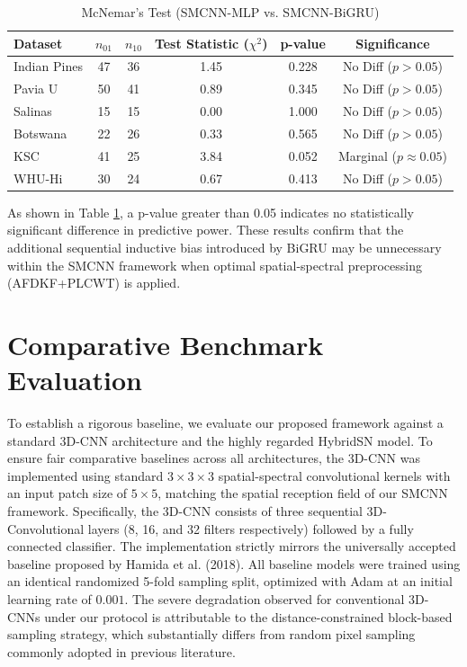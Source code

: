 \documentclass[pdflatex,sn-mathphys-num,iicol]{sn-jnl}
\begin{document}
\begin{table}[!htbp]
\centering
\caption{McNemar's Test (SMCNN-MLP vs. SMCNN-BiGRU)}
\label{tab:mcnemar}
\begin{tabular}{lccccc}
\toprule
\textbf{Dataset} & \textbf{$n_{01}$} & \textbf{$n_{10}$} & \textbf{Test Statistic ($\chi^2$)} & \textbf{p-value} & \textbf{Significance} \\
\midrule
Indian Pines & 47 & 36 & 1.45 & 0.228 & No Diff ($p > 0.05$) \\
Pavia U & 50 & 41 & 0.89 & 0.345 & No Diff ($p > 0.05$) \\
Salinas & 15 & 15 & 0.00 & 1.000 & No Diff ($p > 0.05$) \\
Botswana & 22 & 26 & 0.33 & 0.565 & No Diff ($p > 0.05$) \\
KSC & 41 & 25 & 3.84 & 0.052 & Marginal ($p \approx 0.05$) \\
WHU-Hi & 30 & 24 & 0.67 & 0.413 & No Diff ($p > 0.05$) \\
\bottomrule
\end{tabular}
\end{table}

As shown in Table \ref{tab:mcnemar}, a p-value greater than 0.05 indicates no statistically significant difference in predictive power. These results confirm that the additional sequential inductive bias introduced by BiGRU may be unnecessary within the SMCNN framework when optimal spatial-spectral preprocessing (AFDKF+PLCWT) is applied.

\section{Comparative Benchmark Evaluation}\label{sec:sota_results}

To establish a rigorous baseline, we evaluate our proposed framework against a standard 3D-CNN architecture and the highly regarded HybridSN model. To ensure fair comparative baselines across all architectures, the 3D-CNN was implemented using standard $3\times3\times3$ spatial-spectral convolutional kernels with an input patch size of $5\times5$, matching the spatial reception field of our SMCNN framework. Specifically, the 3D-CNN consists of three sequential 3D-Convolutional layers (8, 16, and 32 filters respectively) followed by a fully connected classifier. The implementation strictly mirrors the universally accepted baseline proposed by Hamida et al. (2018). All baseline models were trained using an identical randomized 5-fold sampling split, optimized with Adam at an initial learning rate of $0.001$. The severe degradation observed for conventional 3D-CNNs under our protocol is attributable to the distance-constrained block-based sampling strategy, which substantially differs from random pixel sampling commonly adopted in previous literature.
\end{document}
